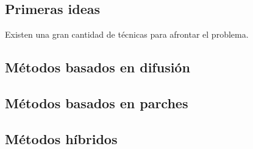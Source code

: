 \documentclass[assd_tpf_main.tex]{subfiles}
\begin{document}
\subsection{Primeras ideas}
Existen una gran cantidad de técnicas para afrontar el problema.


\subsection{Métodos basados en difusión}


\subsection{Métodos basados en parches}


\subsection{M\'etodos h\'ibridos}
\end{document}
